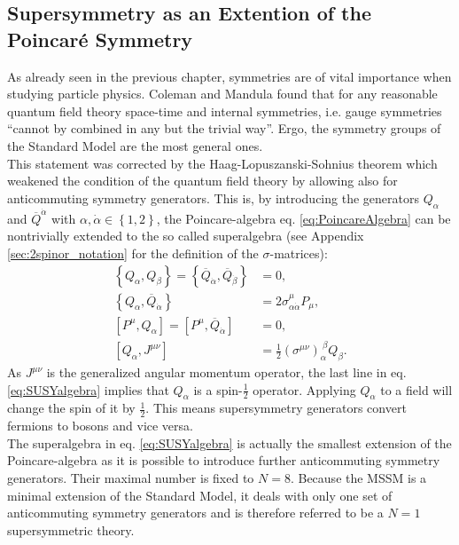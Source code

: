 \subsection{Supersymmetry as an Extention of the Poincaré Symmetry}\label{sec:SUSYalgebra}
As already seen in the previous chapter, symmetries are of vital importance when studying particle physics. Coleman and Mandula \cite{Coleman:1967ad} found that for any reasonable quantum field theory space-time and internal symmetries, i.e. gauge symmetries ``cannot by combined in any but the trivial way''\cite{Pelc:1996vg}. Ergo, the symmetry groups of the Standard Model are the most general ones.\\
This statement was corrected by the Haag-Lopuszanski-Sohnius theorem \cite{Haag:1974qh} which weakened the condition of the quantum field theory by allowing also for anticommuting symmetry generators. This is, by introducing the generators $Q_\alpha$ and $\overline{Q}^{\dot{\alpha}}$ with $\alpha, \dot{\alpha} \in \left\{ 1,2 \right\}$, the Poincare-algebra eq. \eqref{eq:PoincareAlgebra} can be nontrivially extended to the so called superalgebra (see Appendix \eqref{sec:2spinor_notation} for the definition of the $\sigma$-matrices):
\begin{align}
\left\{Q_\alpha,Q_\beta\right\} = \left\{\overline{Q}_{\dot{\alpha}},\overline{Q}_{\dot{\beta}}\right\} &= 0,  \nonumber\\
\left\{Q_\alpha,\overline{Q}_{\dot{\alpha}}\right\} &= 2\sigma^\mu_{\alpha\dot{\alpha}} P_\mu, \nonumber\\
[P^\mu,Q_\alpha] = [P^\mu,\overline{Q}_{\dot{\alpha}}] &= 0, \nonumber \\
[Q_\alpha, J^{\mu\nu}] &= \frac{1}{2} (\sigma^{\mu\nu})_\alpha^{\ \beta} Q_\beta.\label{eq:SUSYalgebra}
\end{align}
As $J^{\mu\nu}$ is the generalized angular momentum operator, the last line in eq. \eqref{eq:SUSYalgebra} implies that $Q_\alpha$ is a spin-$\frac{1}{2}$ operator. Applying $Q_\alpha$ to a field will change the spin of it by $\frac{1}{2}$. This means supersymmetry generators convert fermions to bosons and vice versa.\\
The superalgebra in eq. \eqref{eq:SUSYalgebra} is actually the smallest extension of the Poincare-algebra as it is possible to introduce further anticommuting symmetry generators. Their maximal number is fixed to $N = 8$. Because the MSSM is a minimal extension of the Standard Model, it deals with only one set of anticommuting symmetry generators and is therefore referred to be a $N = 1$ supersymmetric theory.\\
